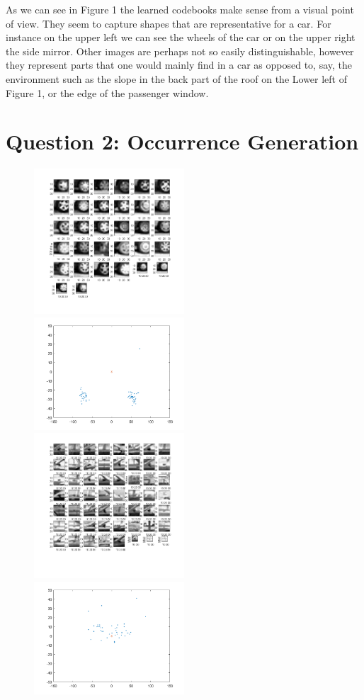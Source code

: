 \documentclass[12pt]{article}
\begin{document}
As we can see in Figure 1 the learned codebooks make sense from a visual point of view. They seem to capture shapes that are representative for a car. For instance on the upper left we can see the wheels of the car or on the upper right the side mirror. Other images are perhaps not so easily distinguishable, however they represent parts that one would mainly find in a car as opposed to, say, the environment such as the slope in the back part of the roof on the Lower left of Figure 1, or the edge of the passenger window.
\newpage
\section*{Question 2: Occurrence Generation}
\begin{figure}[H]
	\includegraphics[width=0.5\textwidth]{features1}
	\includegraphics[width=0.5\textwidth]{clusters1}
	\includegraphics[width=0.5\textwidth]{features2}
	\includegraphics[width=0.5\textwidth]{clusters2}
	

\end{figure}
\end{document}
